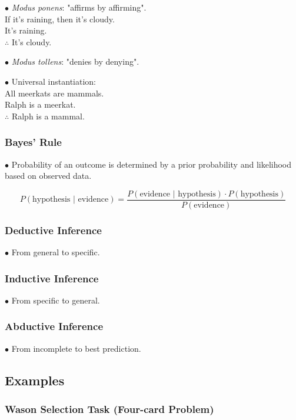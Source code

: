 \documentclass[english,openany]{book}
\begin{document}
$\bullet$ \textit{Modus ponens}: "affirms by affirming". 
\\If it's raining, then it's cloudy.\\ It's raining.\\ $\therefore$ It's cloudy.

$\bullet$ \textit{Modus tollens}: "denies by denying".

\newpage
$\bullet$ Universal instantiation:\\ All meerkats are mammals.\\ Ralph is a meerkat.\\ $\therefore$ Ralph is a mammal.

\subsubsection{Bayes' Rule}

$\bullet$ Probability of an outcome is determined by a prior probability and likelihood based on observed data.

$$P (\textrm{hypothesis } | \textrm{ evidence}) = \frac{P(\textrm{evidence } | \textrm{ hypothesis}) \cdot P(\textrm{hypothesis})}{P(\textrm{evidence})}$$


\subsubsection{Deductive Inference}

$\bullet$ From general to specific.

\subsubsection{Inductive Inference}

$\bullet$ From specific to general.


\subsubsection{Abductive Inference}

$\bullet$ From incomplete to best prediction.

\subsection{Examples}

\subsubsection{Wason Selection Task (Four-card Problem)}
\end{document}
